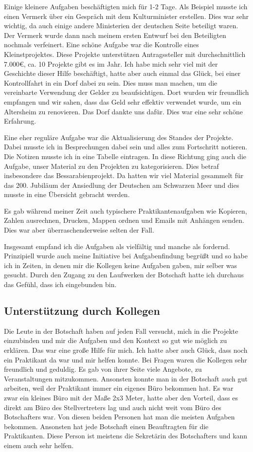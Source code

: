 \documentclass{../../sem_paper}
\begin{document}
Einige kleinere Aufgaben beschäftigten mich für 1-2 Tage. Als Beispiel musste ich einen Vermerk über ein Gespräch mit dem Kulturminister erstellen. Dies war sehr wichtig, da auch einige andere Ministerien der deutschen Seite beteiligt waren. Der Vermerk wurde dann nach meinem ersten Entwurf bei den Beteiligten nochmals verfeinert.
Eine schöne Aufgabe war die Kontrolle eines Kleinstprojektes. Diese Projekte unterstützen Antragssteller mit durchschnittlich 7.000\euro , ca. 10 Projekte gibt es im Jahr. Ich habe mich sehr viel mit der Geschichte dieser Hilfe beschäftigt, hatte aber auch einmal das Glück, bei einer Kontrollfahrt in ein Dorf dabei zu sein. Dies muss man machen, um die vereinbarte Verwendung der Gelder zu beaufsichtigen. Dort wurden wir freundlich empfangen und wir sahen, dass das Geld sehr effektiv verwendet wurde, um ein Altersheim zu renovieren. Das Dorf dankte uns dafür. Dies war eine sehr schöne Erfahrung.

Eine eher reguläre Aufgabe war die Aktualisierung des Standes der Projekte. Dabei musste ich in Besprechungen dabei sein und alles zum Fortschritt notieren. Die Notizen musste ich in eine Tabelle eintragen. In diese Richtung ging auch die Aufgabe, unser Material zu den Projekten zu kategorisieren. Dies betraf insbesondere das Bessarabienprojekt. Da hatten wir viel Material gesammelt für das 200. Jubiläum der Ansiedlung der Deutschen am Schwarzen Meer und dies musste in eine Übersicht gebracht werden.

Es gab während meiner Zeit auch typischere Praktikantenaufgaben wie Kopieren, Zahlen ausrechnen, Drucken, Mappen ordnen und Emails mit Anhängen senden. Dies war aber überraschenderweise selten der Fall.

Insgesamt empfand ich die Aufgaben als vielfältig und manche als fordernd. Prinzipiell wurde auch meine Initiative bei Aufgabenfindung begrüßt und so habe ich in Zeiten, in denen mir die Kollegen keine Aufgaben gaben, mir selber was gesucht. Durch den Zugang zu den Laufwerken der Botschaft hatte ich durchaus das Gefühl, dass ich eingebunden bin.

\subsection{Unterstützung durch Kollegen}
Die Leute in der Botschaft haben auf jeden Fall versucht, mich in die Projekte einzubinden und mir die Aufgaben und  den Kontext so gut wie möglich zu erklären. Das war eine große Hilfe für mich. Ich hatte aber auch Glück, dass noch ein Praktikant da war und mir helfen konnte. Bei Fragen waren die Kollegen sehr freundlich und geduldig. Es gab von ihrer Seite viele Angebote, zu Veranstaltungen mitzukommen. Ansonsten konnte man in der Botschaft auch gut arbeiten, weil der Praktikant immer ein eigenes Büro bekommen hat. Es war zwar ein kleines Büro mit der Maße 2x3 Meter, hatte aber den Vorteil, dass es direkt am Büro des Stellvertreters lag und auch nicht weit vom Büro des Botschafters war. Von diesen beiden Personen hat man die meisten Aufgaben bekommen.
Ansonsten hat jede Botschaft einen Beauftragten für die Praktikanten. Diese Person ist meistens die Sekretärin des Botschafters und kann einem auch sehr helfen. 
\end{document}
